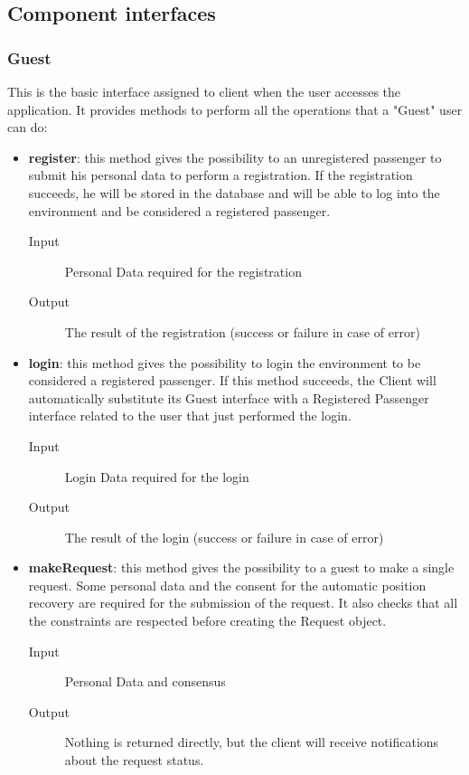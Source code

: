 	\subsection{Component interfaces}
		\subsubsection{Guest}
		This is the basic interface assigned to client when the user accesses the application.
		It provides methods to perform all the operations that a "Guest" user can do:
		\begin{itemize}
			\item \textbf{register}: this method gives the possibility to an unregistered passenger to
			submit his personal data to perform a registration. If the registration succeeds, he will be
			stored in the database and will be able to log into the environment and be considered a registered passenger.
			\begin{description}
				\item[Input] Personal Data required for the registration
				\item[Output] The result of the registration (success or failure in case of error)
			\end{description}
			\item \textbf{login}: this method gives the possibility to login the environment to be considered
			a registered passenger. If this method succeeds, the Client will automatically substitute its Guest
			interface with a Registered Passenger interface related to the user that just performed the login.
			\begin{description}
				\item[Input] Login Data required for the login
				\item[Output] The result of the login (success or failure in case of error)
			\end{description}
			\item \textbf{makeRequest}: this method gives the possibility to a guest to make a single request.
			Some personal data and the consent for the automatic position recovery are required for the submission
			of the request. It also checks that all the constraints are respected before creating the Request object.
			\begin{description}
				\item[Input] Personal Data and consensus
				\item[Output] Nothing is returned directly, but the client will receive notifications about the
				request status.
			\end{description}
		\end{itemize}
